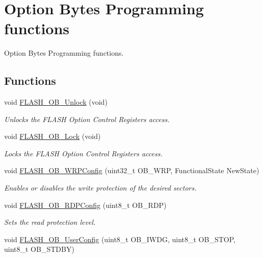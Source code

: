 \hypertarget{group___f_l_a_s_h___group3}{\section{Option Bytes Programming functions}
\label{group___f_l_a_s_h___group3}
}


Option Bytes Programming functions.  


\subsection*{Functions}
\begin{DoxyCompactItemize}
\item 
void \hyperlink{group___f_l_a_s_h___group3_ga518d6e3bbba2adf1523e8454f62348e9}{F\-L\-A\-S\-H\-\_\-\-O\-B\-\_\-\-Unlock} (void)
\begin{DoxyCompactList}\small\item\em Unlocks the F\-L\-A\-S\-H Option Control Registers access. \end{DoxyCompactList}\item 
void \hyperlink{group___f_l_a_s_h___group3_ga63a33d9af7e29b64c3806e5505c59b74}{F\-L\-A\-S\-H\-\_\-\-O\-B\-\_\-\-Lock} (void)
\begin{DoxyCompactList}\small\item\em Locks the F\-L\-A\-S\-H Option Control Registers access. \end{DoxyCompactList}\item 
void \hyperlink{group___f_l_a_s_h___group3_gaffe7e91bcce65ac079ae5afa1db568b5}{F\-L\-A\-S\-H\-\_\-\-O\-B\-\_\-\-W\-R\-P\-Config} (uint32\-\_\-t O\-B\-\_\-\-W\-R\-P, Functional\-State New\-State)
\begin{DoxyCompactList}\small\item\em Enables or disables the write protection of the desired sectors. \end{DoxyCompactList}\item 
void \hyperlink{group___f_l_a_s_h___group3_ga12cb6799f725a49cd151eef4d6d1789b}{F\-L\-A\-S\-H\-\_\-\-O\-B\-\_\-\-R\-D\-P\-Config} (uint8\-\_\-t O\-B\-\_\-\-R\-D\-P)
\begin{DoxyCompactList}\small\item\em Sets the read protection level. \end{DoxyCompactList}\item 
void \hyperlink{group___f_l_a_s_h___group3_ga6b605409e4271b4cc6dfb56ed8108a1a}{F\-L\-A\-S\-H\-\_\-\-O\-B\-\_\-\-User\-Config} (uint8\-\_\-t O\-B\-\_\-\-I\-W\-D\-G, uint8\-\_\-t O\-B\-\_\-\-S\-T\-O\-P, uint8\-\_\-t O\-B\-\_\-\-S\-T\-D\-B\-Y)

\end{DoxyCompactItemize}
